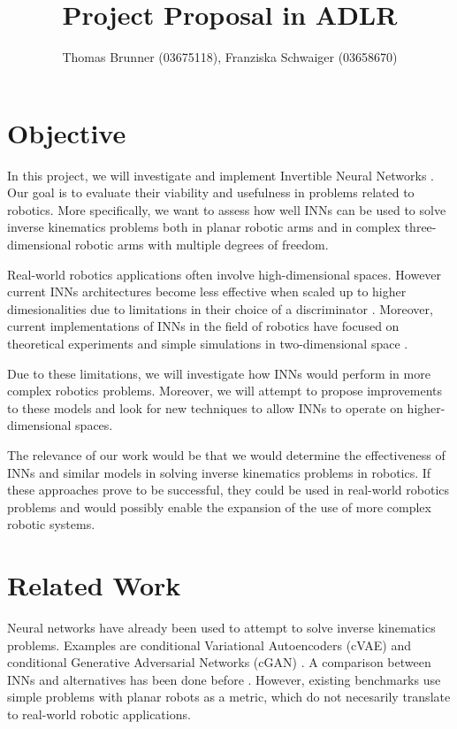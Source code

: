 \documentclass[12pt]{extarticle}
\title{Project Proposal in ADLR}
\author{Thomas Brunner (03675118), Franziska Schwaiger (03658670)}
\begin{document}
\maketitle

\section*{Objective}

In this project, we will investigate and implement Invertible Neural Networks \cite{Ardizzone2018}.
Our goal is to evaluate their viability and usefulness in problems related to robotics.
More specifically, we want to assess how well INNs can be used to solve inverse kinematics problems
both in planar robotic arms and in complex three-dimensional robotic arms with multiple degrees of freedom.

Real-world robotics applications often involve high-dimensional spaces.
However current INNs architectures become less effective when scaled up to higher dimesionalities
due to limitations in their choice of a discriminator \cite{Ardizzone2018}.
Moreover, current implementations of INNs in the field of robotics have focused on theoretical experiments
and simple simulations in two-dimensional space \cite{Ardizzone2018}.

Due to these limitations, we will investigate how INNs would perform in more complex robotics problems.
Moreover, we will attempt to propose improvements to these models and look for new techniques to allow
INNs to operate on higher-dimensional spaces.

The relevance of our work would be that we would determine the effectiveness of INNs
and similar models in solving inverse kinematics problems in robotics.
If these approaches prove to be successful, they could be used in real-world robotics problems
and would possibly enable the expansion of the use of more complex robotic systems.

\section*{Related Work}

Neural networks have already been used to attempt to solve inverse kinematics problems.
Examples are conditional Variational Autoencoders (cVAE) \cite{Sohn2015}
and conditional Generative Adversarial Networks (cGAN) \cite{Mehdi2018}.
A comparison between INNs and alternatives has been done before \cite{Kruse2019}.
However, existing benchmarks use simple problems with planar robots as a metric,
which do not necesarily translate to real-world robotic applications.
\end{document}
